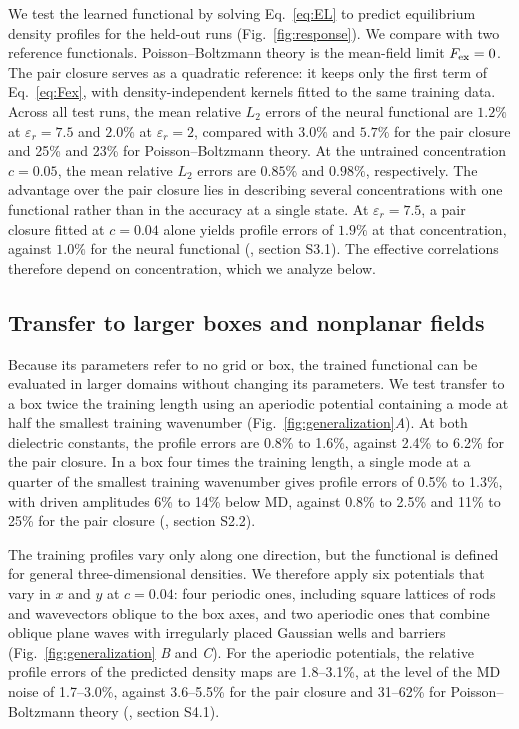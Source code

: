 We test the learned functional by solving Eq.~\ref{eq:EL} to predict equilibrium density profiles for the held-out runs (Fig.~\ref{fig:response}). We compare with two reference functionals. Poisson--Boltzmann theory is the mean-field limit $F_{\rm ex}=0$. The pair closure serves as a quadratic reference: it keeps only the first term of Eq.~\ref{eq:Fex}, with density-independent kernels fitted to the same training data. Across all test runs, the mean relative $L_2$ errors of the neural functional are $1.2\%$ at $\varepsilon_r=7.5$ and $2.0\%$ at $\varepsilon_r=2$, compared with $3.0\%$ and $5.7\%$ for the pair closure and 25\% and 23\% for Poisson--Boltzmann theory. At the untrained concentration $c=0.05$, the mean relative $L_2$ errors are $0.85\%$ and $0.98\%$, respectively.
The advantage over the pair closure lies in describing several concentrations with one functional rather than in the accuracy at a single state. At $\varepsilon_r=7.5$, a pair closure fitted at $c=0.04$ alone yields profile errors of $1.9\%$ at that concentration, against $1.0\%$ for the neural functional (\siref, section S3.1). The effective correlations therefore depend on concentration, which we analyze below.

\subsection*{Transfer to larger boxes and nonplanar fields}
Because its parameters refer to no grid or box, the trained functional can be evaluated in larger domains without changing its parameters. We test transfer to a box twice the training length using an aperiodic potential containing a mode at half the smallest training wavenumber (Fig.~\ref{fig:generalization}\textit{A}). At both dielectric constants, the profile errors are 0.8\% to 1.6\%, against 2.4\% to 6.2\% for the pair closure. In a box four times the training length, a single mode at a quarter of the smallest training wavenumber gives profile errors of 0.5\% to 1.3\%, with driven amplitudes 6\% to 14\% below MD, against 0.8\% to 2.5\% and 11\% to 25\% for the pair closure (\siref, section S2.2).

The training profiles vary only along one direction, but the functional is defined for general three-dimensional densities. We therefore apply six potentials that vary in $x$ and $y$ at $c=0.04$: four periodic ones, including square lattices of rods and wavevectors oblique to the box axes, and two aperiodic ones that combine oblique plane waves with irregularly placed Gaussian wells and barriers (Fig.~\ref{fig:generalization} \textit{B} and \textit{C}). For the aperiodic potentials, the relative profile errors of the predicted density maps are 1.8--3.1\%, at the level of the MD noise of 1.7--3.0\%, against 3.6--5.5\% for the pair closure and 31--62\% for Poisson--Boltzmann theory (\siref, section S4.1).


